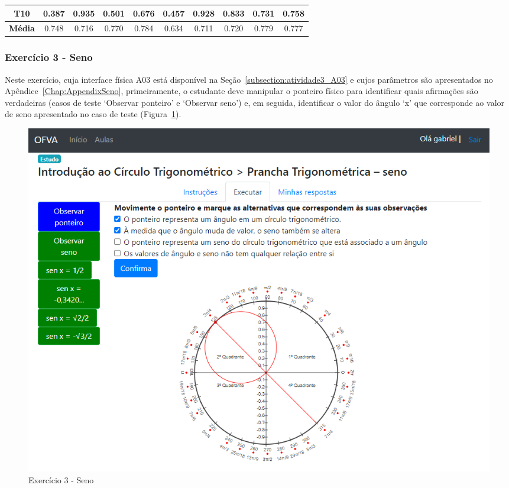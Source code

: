 \begin{table}[htbp]
\begin{tabular}{|c|cccccccc|c|}
		\rowcolor[HTML]{F2F2F2} 
		\textbf{T10}                                             & \multicolumn{1}{c|}{\cellcolor[HTML]{F2F2F2}0.387}        & \multicolumn{1}{c|}{\cellcolor[HTML]{F2F2F2}0.935}        & \multicolumn{1}{c|}{\cellcolor[HTML]{F2F2F2}0.501}        & \multicolumn{1}{c|}{\cellcolor[HTML]{F2F2F2}0.676}        & \multicolumn{1}{c|}{\cellcolor[HTML]{F2F2F2}0.457}        & \multicolumn{1}{c|}{\cellcolor[HTML]{F2F2F2}0.928}        & \multicolumn{1}{c|}{\cellcolor[HTML]{F2F2F2}0.833}        & 0.731                        & 0.758                                                 \\ \hline
		{\color[HTML]{000000} \textbf{Média}}                    & \multicolumn{1}{c|}{{\color[HTML]{000000} 0.748}}         & \multicolumn{1}{c|}{{\color[HTML]{000000} 0.716}}         & \multicolumn{1}{c|}{{\color[HTML]{000000} 0.770}}         & \multicolumn{1}{c|}{{\color[HTML]{000000} 0.784}}         & \multicolumn{1}{c|}{{\color[HTML]{000000} 0.634}}         & \multicolumn{1}{c|}{{\color[HTML]{000000} 0.711}}         & \multicolumn{1}{c|}{{\color[HTML]{000000} 0.720}}         & {\color[HTML]{000000} 0.779} & {\color[HTML]{000000} 0.777}                          \\ \hline
	\end{tabular}
	\label{tab:F3_A2_NCQ_CASOS_}
\end{table}

\subsubsection{Exercício 3 - Seno}\label{subsubsec:F3A3}

Neste exercício, cuja interface física A03 está disponível na Seção~\ref{subsection:atividade3_A03} e cujos parâmetros são apresentados no Apêndice~\ref{Chap:AppendixSeno}, primeiramente, o estudante deve manipular o ponteiro físico para identificar quais afirmações são verdadeiras (casos de teste `Observar ponteiro' e `Observar seno') e, em seguida, identificar o valor do ângulo `x' que corresponde ao valor de seno apresentado no caso de teste (Figura~\ref{fig:E3}).
 
\begin{figure}[htb]
	\centering
	\includegraphics[width=0.9\linewidth]{chapters/results/Fase 3/E3_Virtual.png}
	\caption{Exercício 3 - Seno}
	\label{fig:E3}
\end{figure}

